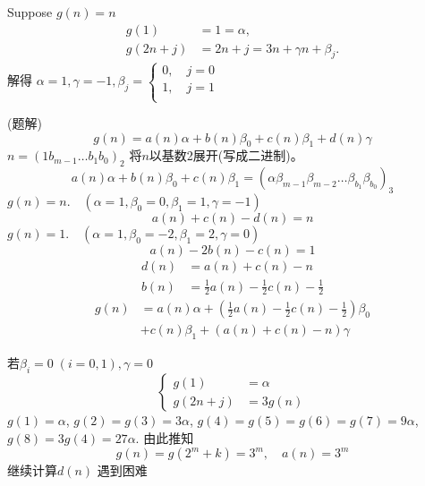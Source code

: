 \begin{answer}
	Suppose $ g(n) = n $
	\begin{equation*}
		\begin{aligned}
			g(1) 	&= 1 = \alpha,\\
			g(2n+j)	&= 2n+j = 3n+\gamma n+\beta_j.
		\end{aligned}
	\end{equation*}
解得 $   \alpha = 1, \gamma = -1, \beta_j = \left\{ \begin{array}{l}
	0,\quad j=0\\
	1,\quad j=1\\
\end{array}\right.$

(题解)
\begin{equation*}
	g(n) = a(n)\alpha + b(n)\beta_0 + c(n)\beta_1+d(n)\gamma
\end{equation*}
$ n = (1 b_{m-1}\dots b_1b_0)_2 $ 将$ n $以基数2展开(写成二进制)。\\
\begin{equation*}
	a(n)\alpha + b(n)\beta_0 + c(n)\beta_1 =  (\alpha\beta_{m-1}\beta_{m-2}\dots\beta_{b_1}\beta_{b_0})_3
\end{equation*}
$ g(n) = n.\quad (\alpha=1,\beta_0 = 0,\beta_1=1,  \gamma = -1 )$ 
\begin{equation*}
	a(n)+c(n)-d(n)=n
\end{equation*}
$ g(n)=1. \quad (\alpha=1,\beta_0 = -2,\beta_1=2, \gamma = 0)  $ 
\begin{equation*}
	a(n)-2b(n)-c(n)=1
\end{equation*}
\begin{align*}
	d(n)&=a(n)+c(n)-n\\
	b(n)&=\frac{1}{2}a(n)-\frac{1}{2}c(n)-\frac{1}{2}  
\end{align*}
\begin{align*}
	g(n)&=a(n)\alpha+(\frac{1}{2}a(n)-\frac{1}{2}c(n)-\frac{1}{2})\beta_0 \\
	&+ c(n)\beta_1 + (a(n)+c(n)-n)\gamma
\end{align*}

若$ \beta_i=0\;(i=0,1), \gamma=0 $ 
\begin{equation*}
	\left\{
		\begin{aligned}
			g(1)&=\alpha\\
			g(2n+j)&=3g(n)
		\end{aligned}
	\right.
\end{equation*}
$ g(1)=\alpha $, $ g(2)=g(3)=3\alpha $, $ g(4)=g(5)=g(6)=g(7)= 9\alpha $, 
$ g(8)=3g(4)=27\alpha $.
由此推知
\begin{equation*}
	g(n)=g(2^m+k)=3^m,\quad a(n)=3^m
\end{equation*}
继续计算$ d(n) $ 遇到困难


\end{answer}
